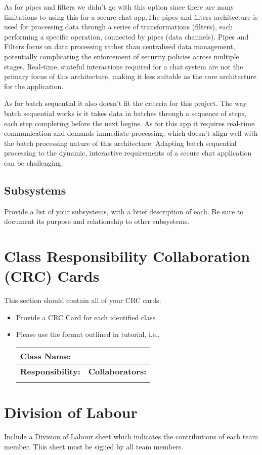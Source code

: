 \documentclass[]{article}
\begin{document}
As for pipes and filters we didn’t go with this option since there are many limitations to using this for a secure chat app.The pipes and filters architecture is used for processing data through a series of transformations (filters), each performing a specific operation, connected by pipes (data channels). Pipes and Filters focus on data processing rather than centralised data management, potentially complicating the enforcement of security policies across multiple stages. Real-time, stateful interactions required for a chat system are not the primary focus of this architecture, making it less suitable as the core architecture for the application.
\medskip

As for batch sequential it also doesn’t fit the criteria for this project. The way batch sequential works is it takes data in batches through a sequence of steps, each step completing before the next begins. As for this app it requires real-time communication and demands immediate processing, which doesn’t align well with the batch processing nature of this architecture. Adapting batch sequential processing to the dynamic, interactive requirements of a secure chat application can be challenging.


\subsection{Subsystems}
\label{sub:subsystems}
 Provide a list of your subsystems, with a brief description of each. Be sure to document its purpose and relationship to other subsystems.


	
\section{Class Responsibility Collaboration (CRC) Cards}
\label{sec:class_responsibility_collaboration_crc_cards}
This section should contain all of your CRC cards.

\begin{itemize}
	\item Provide a CRC Card for each identified class
	\item Please use the format outlined in tutorial, i.e., 
	\begin{table}[ht]
		\centering
		\begin{tabular}{|p{5cm}|p{5cm}|}
		\hline 
		 \multicolumn{2}{|l|}{\textbf{Class Name:}} \\
		\hline
		\textbf{Responsibility:} & \textbf{Collaborators:} \\
		\hline
		\vspace{1in} & \\
		\hline
		\end{tabular}
	\end{table}
	
\end{itemize}

\appendix
\section{Division of Labour}
\label{sec:division_of_labour}
Include a Division of Labour sheet which indicates the contributions of each team member. This sheet must be signed by all team members.
\end{document}
